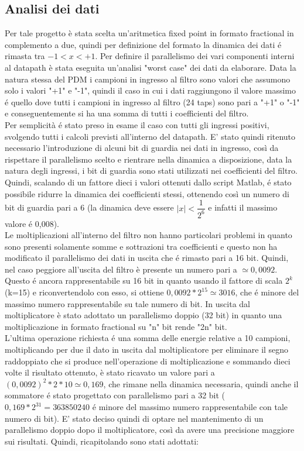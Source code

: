 \documentclass[a4paper, titlepage]{article}
\begin{document}
\subsection{Analisi dei dati}
\label{cap:analisi_dati}
Per tale progetto è stata scelta un'aritmetica fixed point in formato fractional in complemento a due, quindi per definizione del formato la dinamica dei dati é rimasta tra $-1<x<+1$. Per definire il parallelismo dei vari componenti interni al datapath è stata eseguita un'analisi "worst case" dei dati da elaborare.
\newline
Data la natura stessa del PDM i campioni in ingresso al filtro sono valori che assumono solo i valori "+1" e "-1", quindi il caso in cui i dati raggiungono il valore massimo é quello dove tutti i campioni in ingresso al filtro (24 taps) sono pari a "+1" o "-1" e conseguentemente si ha una somma di tutti i coefficienti del filtro.\\ Per semplicità é stato preso in esame il caso con tutti gli ingressi positivi, svolgendo tutti i calcoli previsti all'interno del datapath. E' stato quindi ritenuto necessario l'introduzione di alcuni bit di guardia nei dati in ingresso, così da rispettare il parallelismo scelto e rientrare nella dinamica a disposizione, data la natura degli ingressi, i bit di guardia sono stati utilizzati nei coefficienti del filtro. Quindi, scalando di un fattore dieci i valori ottenuti dallo script Matlab, é stato possibile ridurre la dinamica dei coefficienti stessi, ottenendo così un numero di bit di guardia pari a 6 (la dinamica deve essere $|x|<\dfrac{1}{2^6}$ e infatti il massimo valore é 0,008).\\ Le moltiplicazioni all'interno del filtro non hanno particolari problemi in quanto sono presenti solamente somme e sottrazioni tra coefficienti e questo non ha modificato il parallelismo dei dati in uscita che é rimasto pari a 16 bit. %
Quindi, nel caso peggiore all'uscita del filtro è presente un numero pari a $\simeq 0,0092$. Questo é ancora rappresentabile su 16 bit in quanto usando il fattore di scala $2^k$ (k=15) e riconvertendolo con esso, si ottiene $0,0092*2^{15}\simeq3016$, che é minore del massimo numero rappresentabile su tale numero di bit.
\newline
In uscita dal moltiplicatore è stato adottato un parallelismo doppio (32 bit) in quanto una moltiplicazione in formato fractional su "n" bit rende "2n" bit.\\ L'ultima operazione richiesta é una somma delle energie relative a 10 campioni, moltiplicando per due il dato in uscita dal moltiplicatore per eliminare il segno raddoppiato che si produce nell'operazione di moltiplicazione e sommando dieci volte il risultato ottenuto, è stato ricavato un valore pari a $(0,0092)^2*2*10\simeq0,169$, che rimane nella dinamica necessaria, quindi anche il sommatore é stato progettato con parallelismo pari a 32 bit ($0,169*2^{31}=363850240$ é minore del massimo numero rappresentabile con tale numero di bit). E' stato deciso quindi di optare nel mantenimento di un parallelismo doppio dopo il moltiplicatore, così da avere una precisione maggiore sui risultati. Quindi, ricapitolando sono stati adottati:
\end{document}

